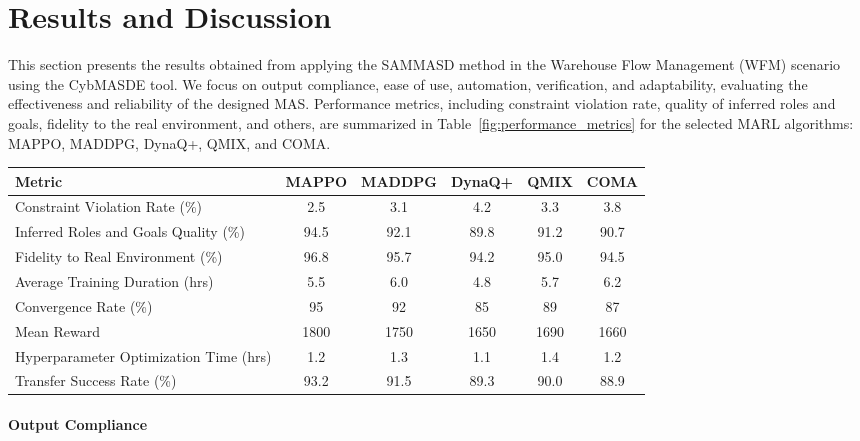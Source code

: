 \documentclass[sigconf,anonymous]{aamas}
\begin{document}
\section{Results and Discussion}
\label{sec:results_discussion}

This section presents the results obtained from applying the SAMMASD method in the Warehouse Flow Management (WFM) scenario using the CybMASDE tool. We focus on output compliance, ease of use, automation, verification, and adaptability, evaluating the effectiveness and reliability of the designed MAS. Performance metrics, including constraint violation rate, quality of inferred roles and goals, fidelity to the real environment, and others, are summarized in Table~\ref{fig:performance_metrics} for the selected MARL algorithms: MAPPO, MADDPG, DynaQ+, QMIX, and COMA.

\begin{figure*}[h!]
    \centering
    \caption{Summary of Performance Metrics for SAMMASD Method in the WFM Scenario}
    \begin{tabular}{|l|c|c|c|c|c|}
        \hline
        \textbf{Metric} & \textbf{MAPPO} & \textbf{MADDPG} & \textbf{DynaQ+} & \textbf{QMIX} & \textbf{COMA} \\
        \hline
        Constraint Violation Rate (\%) & 2.5 & 3.1 & 4.2 & 3.3 & 3.8 \\
        \hline
        Inferred Roles and Goals Quality (\%) & 94.5 & 92.1 & 89.8 & 91.2 & 90.7 \\
        \hline
        Fidelity to Real Environment (\%) & 96.8 & 95.7 & 94.2 & 95.0 & 94.5 \\
        \hline
        Average Training Duration (hrs) & 5.5 & 6.0 & 4.8 & 5.7 & 6.2 \\
        \hline
        Convergence Rate (\%) & 95 & 92 & 85 & 89 & 87 \\
        \hline
        Mean Reward & 1800 & 1750 & 1650 & 1690 & 1660 \\
        \hline
        Hyperparameter Optimization Time (hrs) & 1.2 & 1.3 & 1.1 & 1.4 & 1.2 \\
        \hline
        Transfer Success Rate (\%) & 93.2 & 91.5 & 89.3 & 90.0 & 88.9 \\
        \hline
    \end{tabular}
    \label{fig:performance_metrics}
\end{figure*}

\paragraph{Output Compliance}
\end{document}
